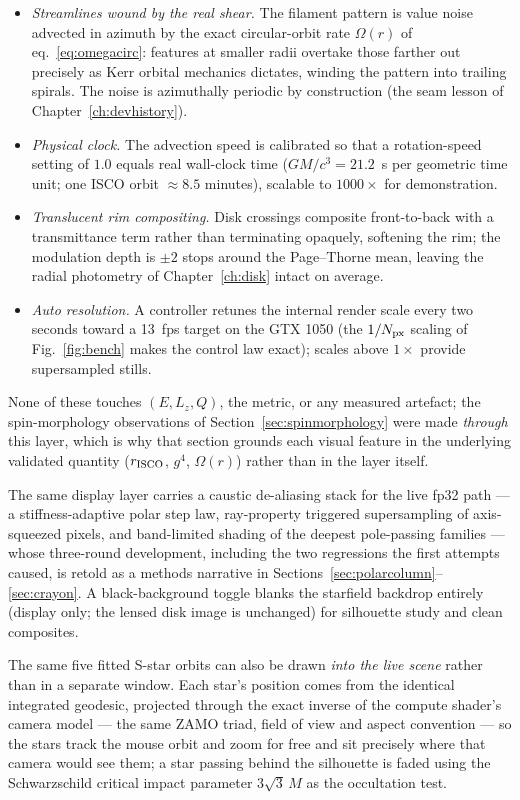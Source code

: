 \begin{itemize}
\item \emph{Streamlines wound by the real shear.} The filament pattern
is value noise advected in azimuth by the exact circular-orbit rate
$\Omega(r)$ of eq.~\eqref{eq:omegacirc}: features at smaller radii
overtake those farther out precisely as Kerr orbital mechanics
dictates, winding the pattern into trailing spirals. The noise is
azimuthally periodic by construction (the seam lesson of
Chapter~\ref{ch:devhistory}).
\item \emph{Physical clock.} The advection speed is calibrated so that
a rotation-speed setting of $1.0$ equals real \sgra{} wall-clock time
($GM/c^3 = 21.2$~s per geometric time unit; one ISCO orbit
$\approx 8.5$ minutes), scalable to $1000\times$ for demonstration.
\item \emph{Translucent rim compositing.} Disk crossings composite
front-to-back with a transmittance term rather than terminating
opaquely, softening the rim; the modulation depth is $\pm2$ stops
around the Page--Thorne mean, leaving the radial photometry of
Chapter~\ref{ch:disk} intact on average.
\item \emph{Auto resolution.} A controller retunes the internal render
scale every two seconds toward a 13~fps target on the GTX 1050
(the $1/N_{\rm px}$ scaling of Fig.~\ref{fig:bench} makes the control
law exact); scales above $1\times$ provide supersampled stills.
\end{itemize}

None of these touches $(E, L_z, Q)$, the metric, or any measured
artefact; the spin-morphology observations of
Section~\ref{sec:spinmorphology} were made \emph{through} this layer,
which is why that section grounds each visual feature in the underlying
validated quantity ($r_{\rm ISCO}$, $g^4$, $\Omega(r)$) rather than in
the layer itself.

The same display layer carries a caustic de-aliasing stack for the
live fp32 path — a stiffness-adaptive polar step law, ray-property
triggered supersampling of axis-squeezed pixels, and band-limited
shading of the deepest pole-passing families — whose three-round
development, including the two regressions the first attempts caused,
is retold as a methods narrative in
Sections~\ref{sec:polarcolumn}--\ref{sec:crayon}. A black-background
toggle blanks the starfield backdrop entirely (display only; the
lensed disk image is unchanged) for silhouette study and clean
composites.

The same five fitted S-star orbits can also be drawn \emph{into the
live scene} rather than in a separate window. Each star's position
comes from the identical integrated geodesic, projected through the
exact inverse of the compute shader's camera model — the same ZAMO
triad, field of view and aspect convention — so the stars track the
mouse orbit and zoom for free and sit precisely where that camera
would see them; a star passing behind the silhouette is faded using
the Schwarzschild critical impact parameter $3\sqrt3\,M$ as the
occultation test.

